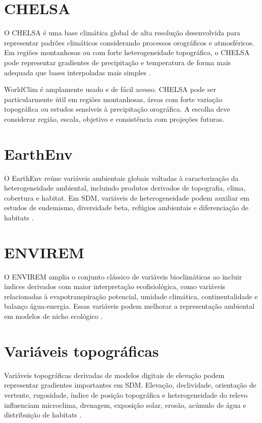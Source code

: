\section{CHELSA}

O CHELSA é uma base climática global de alta resolução desenvolvida para representar padrões climáticos considerando processos orográficos e atmosféricos. Em regiões montanhosas ou com forte heterogeneidade topográfica, o CHELSA pode representar gradientes de precipitação e temperatura de forma mais adequada que bases interpoladas mais simples \parencite{karger2017chelsa}.

\begin{dica}[title={\faLightbulb\quad WorldClim ou CHELSA?}]
	WorldClim é amplamente usado e de fácil acesso. CHELSA pode ser particularmente útil em regiões montanhosas, áreas com forte variação topográfica ou estudos sensíveis à precipitação orográfica. A escolha deve considerar região, escala, objetivo e consistência com projeções futuras.
\end{dica}

\section{EarthEnv}

O EarthEnv reúne variáveis ambientais globais voltadas à caracterização da heterogeneidade ambiental, incluindo produtos derivados de topografia, clima, cobertura e habitat. Em SDM, variáveis de heterogeneidade podem auxiliar em estudos de endemismo, diversidade beta, refúgios ambientais e diferenciação de habitats \parencite{amatulli2018data}.

\section{ENVIREM}

O ENVIREM amplia o conjunto clássico de variáveis bioclimáticas ao incluir índices derivados com maior interpretação ecofisiológica, como variáveis relacionadas à evapotranspiração potencial, umidade climática, continentalidade e balanço água-energia. Essas variáveis podem melhorar a representação ambiental em modelos de nicho ecológico \parencite{title2018envirem}.

\section{Variáveis topográficas}

Variáveis topográficas derivadas de modelos digitais de elevação podem representar gradientes importantes em SDM. Elevação, declividade, orientação de vertente, rugosidade, índice de posição topográfica e heterogeneidade do relevo influenciam microclima, drenagem, exposição solar, erosão, acúmulo de água e distribuição de habitats \parencite{farr2007srtm}.

